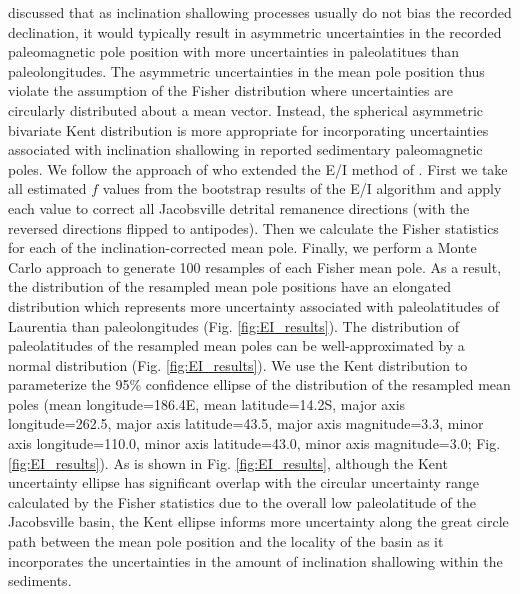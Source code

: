 \documentclass[draft]{agujournal2019}
\begin{document}
 discussed that as inclination shallowing processes usually do not bias the recorded declination, it would typically result in asymmetric uncertainties in the recorded paleomagnetic pole position with more uncertainties in paleolatitues than paleolongitudes. The asymmetric uncertainties in the mean pole position thus violate the assumption of the Fisher distribution \cite{Fisher1953a} where uncertainties are circularly distributed about a mean vector. Instead, the spherical asymmetric bivariate Kent distribution \cite{Kent1983a} is more appropriate for incorporating uncertainties associated with inclination shallowing in reported sedimentary paleomagnetic poles. We follow the approach of  who extended the E/I method of . First we take all estimated $f$ values from the bootstrap results of the E/I algorithm and apply each value to correct all Jacobsville detrital remanence directions (with the reversed directions flipped to antipodes). Then we calculate the Fisher statistics for each of the inclination-corrected mean pole. Finally, we perform a Monte Carlo approach to generate 100 resamples of each Fisher mean pole. As a result, the distribution of the resampled mean pole positions have an elongated distribution which represents more uncertainty associated with paleolatitudes of Laurentia than paleolongitudes (Fig. \ref{fig:EI_results}). The distribution of paleolatitudes of the resampled mean poles can be well-approximated by a normal distribution (Fig. \ref{fig:EI_results}). We use the Kent distribution to parameterize the 95\% confidence ellipse of the distribution of the resampled mean poles (mean longitude=186.4\textdegree E, mean latitude=14.2\textdegree S, major axis longitude=262.5, major axis latitude=43.5, major axis magnitude=3.3\textdegree, minor axis longitude=110.0, minor axis latitude=43.0, minor axis magnitude=3.0\textdegree; Fig. \ref{fig:EI_results}). As is shown in Fig. \ref{fig:EI_results}, although the Kent uncertainty ellipse has significant overlap with the circular uncertainty range calculated by the Fisher statistics due to the overall low paleolatitude of the Jacobsville basin, the Kent ellipse informs more uncertainty along the great circle path between the mean pole position and the locality of the basin as it incorporates the uncertainties in the amount of inclination shallowing within the sediments. 
\end{document}

